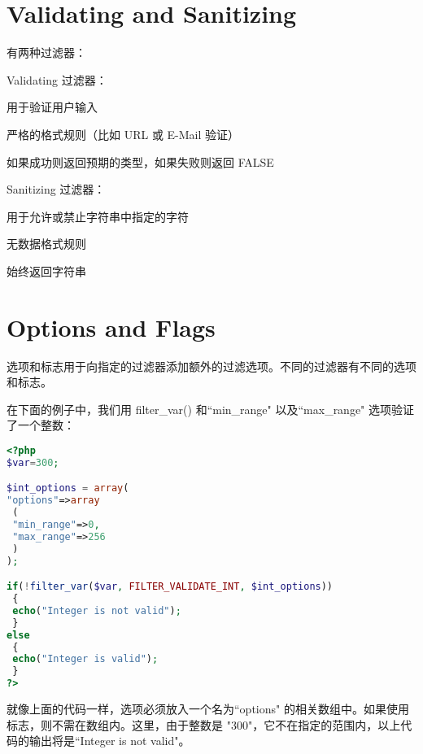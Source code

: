 \section{Validating and Sanitizing}

有两种过滤器：

\begin{compactitem}
\item Validating 过滤器：

\begin{compactitem}
\item 用于验证用户输入
\item 严格的格式规则（比如 URL 或 E-Mail 验证）
\item 如果成功则返回预期的类型，如果失败则返回 FALSE
\end{compactitem}

\item Sanitizing 过滤器：

\begin{compactitem}
\item 用于允许或禁止字符串中指定的字符
\item 无数据格式规则
\item 始终返回字符串
\end{compactitem}


\end{compactitem}


\section{Options and Flags}


选项和标志用于向指定的过滤器添加额外的过滤选项。不同的过滤器有不同的选项和标志。


在下面的例子中，我们用 filter\_var() 和``min\_range" 以及``max\_range" 选项验证了一个整数：

\begin{lstlisting}[language=PHP]
<?php
$var=300;

$int_options = array(
"options"=>array
 (
 "min_range"=>0,
 "max_range"=>256
 )
);

if(!filter_var($var, FILTER_VALIDATE_INT, $int_options))
 {
 echo("Integer is not valid");
 }
else
 {
 echo("Integer is valid");
 }
?>
\end{lstlisting}

就像上面的代码一样，选项必须放入一个名为``options" 的相关数组中。如果使用标志，则不需在数组内。这里，由于整数是 "300"，它不在指定的范围内，以上代码的输出将是``Integer is not valid"。






